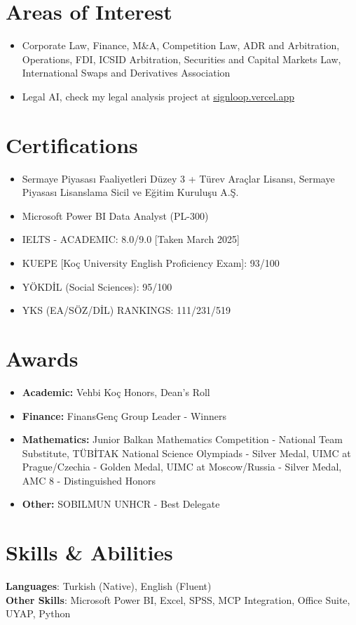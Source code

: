 \documentclass[letterpaper,11pt]{article}
\newcommand{\resumeItem}[1]{\item\small{{
    {#1 \vspace{-2pt}}
  }}}
\newcommand{\resumeItemListStart}{\begin{itemize}[parsep=0pt]}
\newcommand{\resumeItemListEnd}{\end{itemize}\vspace{-27pt}}
\begin{document}
\section{Areas of Interest}
\resumeItemListStart
    \resumeItem{Corporate Law, Finance, M\&A, Competition Law, ADR and Arbitration, Operations, FDI, ICSID Arbitration, Securities and Capital Markets Law, International Swaps and Derivatives Association}
    \resumeItem{Legal AI, check my legal analysis project at \href{https://signloop.vercel.app}{\underline{signloop.vercel.app}}}
\resumeItemListEnd
\section{Certifications}
\resumeItemListStart
    \resumeItem{Sermaye Piyasası Faaliyetleri Düzey 3 + Türev Araçlar Lisansı, Sermaye Piyasası Lisanslama Sicil ve Eğitim Kuruluşu A.Ş.}
    \resumeItem{Microsoft Power BI Data Analyst (PL-300)}
    \resumeItem{IELTS - ACADEMIC: 8.0/9.0 [Taken March 2025]}
    \resumeItem{KUEPE [Koç University English Proficiency Exam]: 93/100}
    \resumeItem{YÖKDİL (Social Sciences): 95/100}
    \resumeItem{YKS (EA/SÖZ/DİL) RANKINGS: 111/231/519}
\resumeItemListEnd

\section{Awards}
\resumeItemListStart
    \resumeItem{\textbf{Academic:} Vehbi Koç Honors, Dean's Roll}
    \resumeItem{\textbf{Finance:} FinansGenç Group Leader - Winners}
    \resumeItem{\textbf{Mathematics:} Junior Balkan Mathematics Competition - National Team Substitute, TÜBİTAK National Science Olympiads - Silver Medal, UIMC at Prague/Czechia - Golden Medal, UIMC at Moscow/Russia - Silver Medal, AMC 8 - Distinguished Honors}
    \resumeItem{\textbf{Other:} SOBILMUN UNHCR - Best Delegate}
\resumeItemListEnd

\section{Skills \& Abilities}
 \begin{itemize}[leftmargin=0.15in, label={}]
    \small{\item{
     \textbf{Languages}{: Turkish (Native), English (Fluent)} \\
     \textbf{Other Skills}{: Microsoft Power BI, Excel, SPSS, MCP Integration, Office Suite, UYAP, Python}
    }}
 \end{itemize}\vspace{-27pt}
\end{document}
